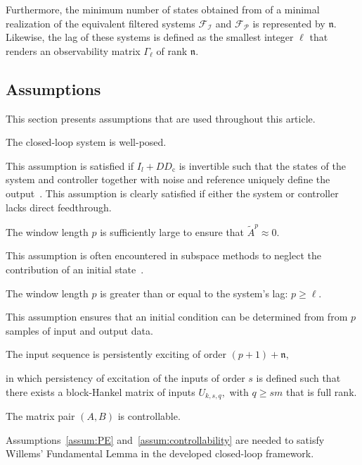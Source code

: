 Furthermore, the minimum number of states obtained from of a minimal realization of the equivalent filtered systems $\mathcal{F}_\mathcal{I}$ and $\mathcal{F}_\mathcal{P}$ is represented by $\mathfrak{n}$. Likewise, the lag of these systems is defined as the smallest integer $\ell$ that renders an observability matrix $\Gamma_\ell$ of rank $\mathfrak{n}$.

\subsection{Assumptions}
This section presents assumptions that are used throughout this article.
\begin{assum}\label{assum:well_posed}
    The closed-loop system is well-posed.
\end{assum}
This assumption is satisfied if $I_l+DD_\mathrm{c}$ is invertible such that the states of the system and controller together with noise and reference uniquely define the output~\citep{VanOverschee1997}. This assumption is clearly satisfied if either the system or controller lacks direct feedthrough.
\begin{assum}\label{assum:initial_contribution}
    The window length $p$ is sufficiently large to ensure that $\tilde{A}^p\approx0$.
\end{assum}
This assumption is often encountered in subspace methods to neglect the contribution of an initial state~\citep{Chiuso2007}.
\begin{assum}\label{assum:unique_initial}
    The window length $p$ is greater than or equal to the system's lag: $p\geq\ell$.
\end{assum}
This assumption ensures that an initial condition can be determined from from $p$ samples of input and output data.
\begin{assum}\label{assum:PE}
    The input sequence is persistently exciting of order $(p+1)+\mathfrak{n},$
\end{assum}
in which persistency of excitation of the inputs of order $s$ is defined such that there exists a block-Hankel matrix of inputs $U_{k,s,q},$ with $q\geq sm$ that is full rank.
\begin{assum}\label{assum:controllability}
    The matrix pair $(A,B)$ is controllable.
\end{assum}
Assumptions~\ref{assum:PE} and~\ref{assum:controllability} are needed to satisfy Willems' Fundamental Lemma in the developed closed-loop framework.